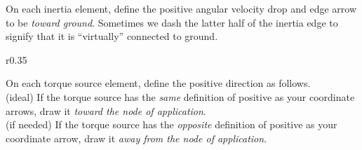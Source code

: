 \documentclass[dynamic_systems.tex]{subfiles}
\begin{document}
\quad On each inertia element, define the positive angular velocity drop and edge arrow to be \emph{toward ground}.
Sometimes we dash the latter half of the inertia edge to signify that it is ``virtually'' connected to ground.
\endgroup

\begingroup
\setlength\intextsep{0pt}
\begin{wrapfigure}[8]{r}{0.35\textwidth}
  \centering
	\ifdefined\ispartial
		\blanklineargraphrot{}
	\else
	\fi
\end{wrapfigure}

\quad On each torque source element, define the positive direction as follows.\\
(ideal) If the torque source has the \emph{same} definition of positive as your coordinate arrows, draw it \emph{toward the node of application}. \\
(if needed) If the torque source has the \emph{opposite} definition of positive as your coordinate arrow, draw it \emph{away from the node of application}.

\endgroup
\end{document}
